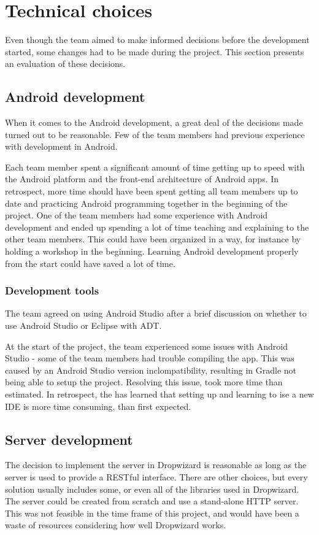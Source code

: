 \newpage
\section{Technical choices}
Even though the team aimed to make informed decisions before the development started, some changes had to be made during the project. This section presents an evaluation of these decisions.

\subsection{Android development}
When it comes to the Android development, a great deal of the decisions made turned out to be reasonable. Few of the team members had previous experience with development in Android.

Each team member spent a significant amount of time getting up to speed with the Android platform and the front-end architecture of Android apps. In retrospect, more time should have been spent getting all team members up to date and practicing Android programming together in the beginning of the project. One of the team members had some experience with Android development and ended up spending a lot of time teaching and explaining to the other team members. This could have been organized in a way, for instance by holding a workshop in the beginning. Learning Android development properly from the start could have saved a lot of time.

\subsubsection{Development tools}
The team agreed on using Android Studio after a brief discussion on whether to use Android Studio or Eclipse with ADT.
 
At the start of the project, the team experienced some issues with Android Studio - some of the team members had trouble compiling the app. This was caused by an Android Studio version inclompatibility, resulting in Gradle not being able to setup the project. Resolving this issue, took more time than estimated. In retrospect, the has learned that setting up and learning to ise a new IDE is more time consuming, than first expected. 

\subsection{Server development}

The decision to implement the server in Dropwizard is reasonable as long as the server is used to provide a RESTful interface. There are other choices, but every solution usually includes some, or even all of the libraries used in Dropwizard. The server could be created from scratch and use a stand-alone HTTP server. This was not feasible in the time frame of this project, and would have been a waste of resources considering how well Dropwizard works.

